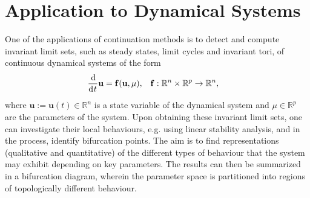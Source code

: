 %
\section{Application to Dynamical Systems}\label{sc_app}
One of the applications of continuation methods is to detect and compute invariant limit sets, such as steady states, limit cycles and invariant tori, of continuous dynamical systems of the form
\begin{align}
\label{dyn_sys}
&\deriv[]{}{t}\mathbf{u} = \mathbf{f}(\mathbf{u},\mu),& & \mathbf{f}: \mathbb{R}^n\times\mathbb{R}^p\rightarrow\mathbb{R}^n,
\end{align}
where $\mathbf{u}:=\mathbf{u}(t) \in \mathbb{R}^n$ is a state variable of the dynamical system and $\mu \in \mathbb{R}^p$ are the parameters of the system.  Upon obtaining these invariant limit sets, one can investigate their local behaviours, e.g. using linear stability analysis, and in the process, identify bifurcation points. The aim is to find representations (qualitative and quantitative) of the different types of behaviour that the system may exhibit depending on key parameters. The results can then be summarized in a bifurcation diagram, wherein the parameter space is partitioned into regions of topologically different behaviour.


